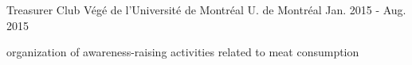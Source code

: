 \begin{cventries}
  \cventry
    {Treasurer} %
    {Club Végé de l'Université de Montréal} %
    {U. de Montréal} %
    {Jan. 2015 - Aug. 2015} %
    {
      \begin{cvitems} %
        \item {organization of awareness-raising activities related to meat consumption}
      \end{cvitems}
    }


\end{cventries}
         